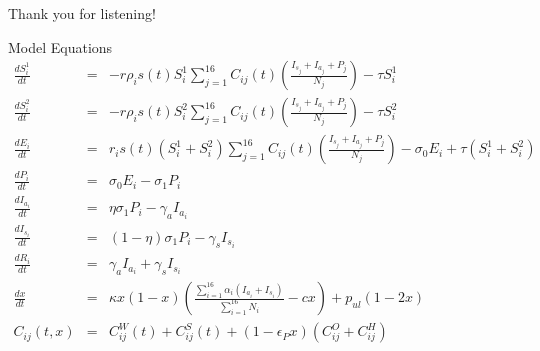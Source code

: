 \documentclass{beamer}
\begin{document}
\begin{frame}{}
    \begin{center}
        \huge
        Thank you for listening!
    \end{center}
\end{frame}

\begin{frame}[t,allowframebreaks]
    \printbibliography
\end{frame}



\begin{frame}{Model Equations}
    \tiny
        \begin{eqnarray}
            \frac{dS^1_i}{dt} &= & - r \rho_i s(t) S^1_i \sum_{j=1}^{16} C_{ij}(t) \left(\frac{I_{s_j} + I_{a_j} + P_j}{N_j}\right) - \tau S^1_i  \label{S1eqn} \\
            \frac{dS^2_i}{dt} &= & - r \rho_i s(t) S^2_i \sum_{j=1}^{16} C_{ij}(t) \left(\frac{I_{s_j} + I_{a_j}+ P_j}{N_j}\right)  - \tau S^2_i  \label{S2eqn} \\
            \frac{dE_i}{dt} &= &  r_i s(t) (S^1_i + S^2_i) \sum_{j=1}^{16} C_{ij}(t) \left(\frac{I_{s_j} + I_{a_j}+ P_j}{N_j}\right) - \sigma_0 E_i + \tau (S^1_i + S^2_i)\label{Eeqn} \\
            \frac{dP_i}{dt} &= & \sigma_0 E_i - \sigma_1 P_i \label{Peqn} \\
            \frac{dI_{a_i}}{dt} &= & \eta \sigma_1 P_i - \gamma_a I_{a_i}\label{Ieqn} \\
            \frac{dI_{s_i}}{dt} &= & (1 - \eta) \sigma_1 P_i - \gamma_s I_{s_i} \label{Ieqn} \\
            \frac{dR_i}{dt} &= & \gamma_a I_{a_i} + \gamma_s I_{s_i}  \label{Reqn} \\
            \frac{dx}{dt} &= &\kappa x (1-x) \left(\frac{\sum_{i=1}^{16}\alpha_i(I_{a_i} + I_{s_i})}{\sum_{i=1}^{16} N_i} - c x\right) + p_{ul}(1-2 x)  \label{xeqn_new}\\
    C_{ij}(t,x) &= & C^W_{ij}(t) + C^S_{ij}(t) + (1 - \epsilon_P x )\left({C}^O_{ij} + {C}^H_{ij}\right)
        \end{eqnarray}
    \end{frame}



    
     
\end{document}
